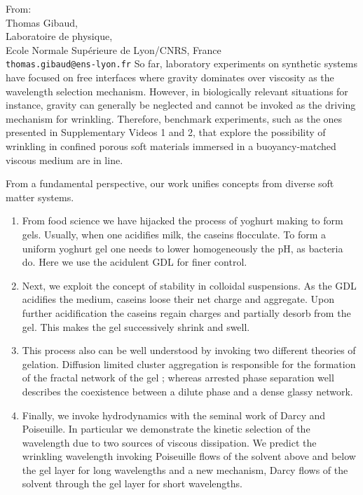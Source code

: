 \documentclass[a4paper, parskip=true, firsthead=false, fromemail=true, foldmarks=false]{scrlttr2}
\begin{document}
\begin{letter}{From:\\
Thomas Gibaud,\\
Laboratoire de physique,\\
Ecole Normale Supérieure de Lyon/CNRS, France\\
\texttt{thomas.gibaud@ens-lyon.fr}
}
So far, laboratory experiments on synthetic systems have focused on free interfaces where gravity dominates over viscosity as the wavelength selection mechanism. However, in biologically relevant situations for instance, gravity can generally be neglected and cannot be invoked as the driving mechanism for wrinkling. Therefore, benchmark experiments, such as the ones presented in Supplementary Videos 1 and 2, that explore the possibility of wrinkling in confined porous soft materials immersed in a buoyancy-matched viscous medium are in line.

From a fundamental perspective, our work unifies concepts from diverse soft matter systems.
\begin{enumerate}
\item From food science we have hijacked the process of yoghurt making to form gels. Usually, when one acidifies milk, the caseins flocculate. To form a uniform yoghurt gel one needs to lower homogeneously the pH, as bacteria do. Here we use the acidulent GDL for finer control.

\item  Next, we exploit the concept of stability in colloidal suspensions. As the GDL acidifies the medium, caseins loose their net charge and aggregate. Upon further acidification the caseins regain charges and partially desorb from the gel. This makes the gel successively shrink and swell.

\item This process also can be well understood by invoking two different theories of gelation. Diffusion limited cluster aggregation is responsible for the formation of the fractal network of the gel ; whereas arrested phase separation well describes the coexistence between a dilute phase and a dense glassy network.

\item Finally, we invoke hydrodynamics with the seminal work of Darcy and Poiseuille. In particular we demonstrate the kinetic selection of the wavelength due to two sources of viscous dissipation. We predict the wrinkling wavelength invoking Poiseuille flows of the solvent above and below the gel layer for long wavelengths and a new mechanism, Darcy flows of the solvent through the gel layer for short wavelengths.
\end{enumerate}




\end{letter}
\end{document}
